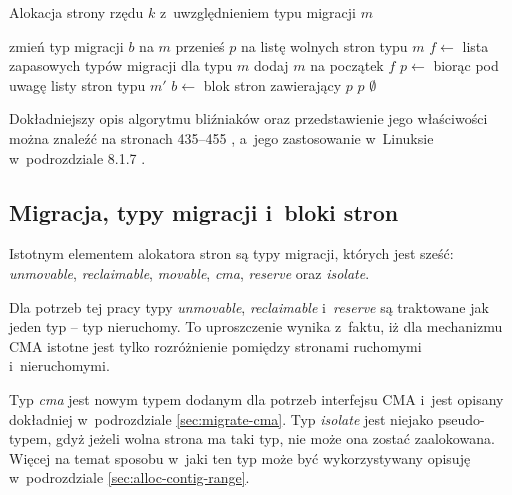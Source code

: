 \begin{algorithm}
\caption[Alokacja z~uwzględnieniem typu migracji.]{Alokacja strony
  rzędu $k$ z~uwzględnieniem typu migracji $m$}
\label{alg:buddy-fallback}
\begin{algorithmic}[1]
\State zmień typ migracji $b$ na $m$
    \State przenieś $p$ na listę wolnych stron typu $m$
\EndFor
\EndFunction
\Statex
{}
    \State $f \gets$ lista zapasowych typów migracji dla typu $m$
    \State dodaj $m$ na początek $f$
        \State $p \gets$  biorąc pod uwagę listy stron typu $m'$
                \State $b \gets$ blok stron zawierający $p$
                \State {}
            \EndIf
            \State \Return $p$
        \EndIf
    \EndFor
    \State \Return $\emptyset$
\EndFunction
\end{algorithmic}
\end{algorithm}
Dokładniejszy opis algorytmu bliźniaków oraz przedstawienie jego
właściwości można znaleźć na stronach 435--455
\autocite{bib:taocp-fa}, a~jego zastosowanie w~Linuksie w~podrozdziale
8.1.7 \autocite{bib:utlk}.


\subsection{Migracja, typy migracji i~bloki stron}\label{sec:migratetype}

Istotnym elementem alokatora stron są typy migracji, których jest
sześć: \textit{unmovable}, \textit{reclaimable}, \textit{movable},
\textit{cma}, \textit{reserve} oraz \textit{isolate}.

Dla potrzeb tej pracy typy \textit{unmovable}, \textit{reclaimable}
i~{\it reserve} są traktowane jak jeden typ -- typ nieruchomy.  To
uproszczenie wynika z~faktu, iż dla mechanizmu CMA istotne jest tylko
rozróżnienie pomiędzy stronami ruchomymi i~nieruchomymi.

Typ \textit{cma} jest nowym typem dodanym dla potrzeb interfejsu CMA
i~jest opisany dokładniej w~podrozdziale \ref{sec:migrate-cma}.  Typ
\textit{isolate} jest niejako pseudo-typem, gdyż jeżeli wolna strona
ma taki typ, nie może ona zostać zaalokowana.  Więcej na temat sposobu
w~jaki ten typ może być wykorzystywany opisuję w~podrozdziale
\ref{sec:alloc-contig-range}.

